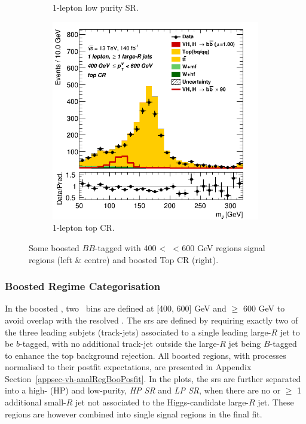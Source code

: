 \begin{figure}[h!]
\begin{subfigure}[b]{0.32\textwidth}
      \caption{1-lepton low purity SR.}
      \label{fig:plots_VHboost_ex_1L_SR}
  \end{subfigure}
  \begin{subfigure}[b]{0.32\textwidth}
    \centering
    \includegraphics[width=\textwidth]{Images/VH/Own_fit/prefit_VHbb/Region_distmBB_BMax600_BMin400_incFat1_Fat1_DSRtopaddbjetcr_J0_TTypebb_incJet1_T2_L1_Y6051_Prefit.png}
    \caption{1-lepton top CR.}
    \label{fig:plots_VHboost_ex_1L_top}
\end{subfigure}
  \caption{Some boosted $BB$-tagged with 400 < \ptv\ < 600 GeV regions signal regions (left \& centre) and boosted Top CR (right).}
  \label{fig:plots_VHboost_ex}
\end{figure} 

\subsubsection{Boosted Regime Categorisation}
In the boosted \vhb, two \ptv\ bins are defined at [400, 600] GeV and $\geq$ 600 GeV to avoid overlap with the resolved \vhb. The \gls{sr}s are defined by requiring exactly two of the three leading subjets (track-jets) associated to a single leading large-$R$ jet to be $b$-tagged, with no additional track-jet outside the large-$R$ jet being $B$-tagged to enhance the top background rejection. All boosted regions, with processes normalised to their postfit expectations, are presented in Appendix Section~\ref{appsec-vh-analRegBooPosfit}. In the plots, the \gls{sr}s are further separated into a high- (HP) and low-purity, \textit{HP SR} and \textit{LP SR}, when there are no or $\geq$ 1 additional small-$R$ jet not associated to the Higgs-candidate large-$R$ jet. These regions are however combined into single signal regions in the final fit.

